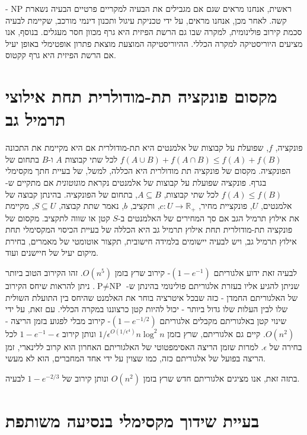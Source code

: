 \begin{hebrew}
ראשית, אנחנו מראים שגם אם מגבילים את הבעיה למקריים פרטיים הבעיה נשארת
$\text{NP}$%
-קשה.
לאחר מכן, אנחנו מראים, על ידי טכניקת עיגול ותכנון דינמי מורכב, שקיימת לבעיה סכמת קירוב פולינומית, למקרה שבו גם הרשת הפיזית היא גרף מכוון חסר מעגלים.
בנוסף, אנו מציעים היוריסטיקה למקרה הכללי.
ההיוריסטיקה המוצעת  מוצאת פתרון אופטימלי באופן יעיל אם הרשת הפיזית היא גרף קקטוס.



\section*{\texthebrew{מקסום פונקציה תת-מודולרית תחת אילוצי תרמיל גב}}
פונקציה,
$f$,
שפועלת על קבוצות של אלמנטים היא תת-מודולרית אם היא מקיימת את התכונה
$f(A \cup B) + f(A \cap B) \leq f(A) + f(B)$
לכל שתי קבוצות $A$ ו-$B$ בתחום של הפונקציה.
מקסום של פונקציה תת מודולרית היא הכללה, למשל, של בעיית חתך מקסימלי בגרף.
פונקציה שפועלת על קבוצות  של אלמנטים נקראת
\emph{מונוטונית}
אם מתקיים ש-%
$f(A) \leq f(B)$
לכל שתי קבוצות,
$A \subseteq B$,
בתחום של הפונקציה.
בהינתן קבוצה של אלמנטים, $U$, פונקציית מחיר,
$c:U \to \mathbb{R_+}$,
ותקציב, $b$, נאמר שתת קבוצה,
$S \subseteq U$,
מקיימת את אילוץ תרמיל הגב אם סך המחירים של האלמנטים ב-$S$ קטן או שווה לתקציב.
מקסום של פונקציה תת-מודולרית תחת אילוץ תרמיל גב היא הכללה של בעיית הכיסוי המקסימלי תחת אילוץ תרמיל גב,
ויש לבעיה יישומים בלמידה חישובית, תקצור אוטומטי של מאמרים, בחירת מיקום יעיל של חיישנים ועוד.


לבעיה זאת ידוע אלגוריתם
$(1-e^{-1})$-%
קירוב שרץ בזמן
$O(n^5)$.
זהו הקירוב הטוב ביותר שניתן להגיע אליו בעזרת אלגוריתם פולינומי בהינתן ש-%
$\text{P} \neq \text{NP}$.
ניתן להראות שיחס הקירוב של האלגוריתם החמדן - כזה שבכל איטרציה בוחר את האלמנט שהיחס בין התועלת השולית שלו לבין העלות שלו גדול ביותר - יכול להיות קטן כרצוננו במקרה הכללי.
עם זאת, על ידי שינוי קטן באלגוריתם מקבלים אלגוריתם
$(1 - e^{-1/2})$-%
קירוב מבלי לפגוע בזמן הריצה -
$O(n^2)$.
קיים גם אלגוריתם, שרץ בזמן
$1/\epsilon^{O(1/\epsilon^4)}n\log^2n$
ונותן קירוב
$1 - e^{-1} -\epsilon$
לכל בחירה של
$\epsilon$.
למרות שזמן הריצה האסימפטוטי של האלגוריתם האחרון הוא קרוב ללינארי, זמן הריצה בפועל של אלגוריתם כזה, כמו שצוין על ידי אחד המחברים, הוא לא מעשי.

בתזה זאת, אנו מציגים אלגוריתם חדש שרץ בזמן
$O(n^2)$
ונותן קירוב של
$1 - e^{-2/3}$
לבעיה.




\section*{\texthebrew{בעיית שידוך מקסימלי בנסיעה משותפת}}


\end{hebrew}
